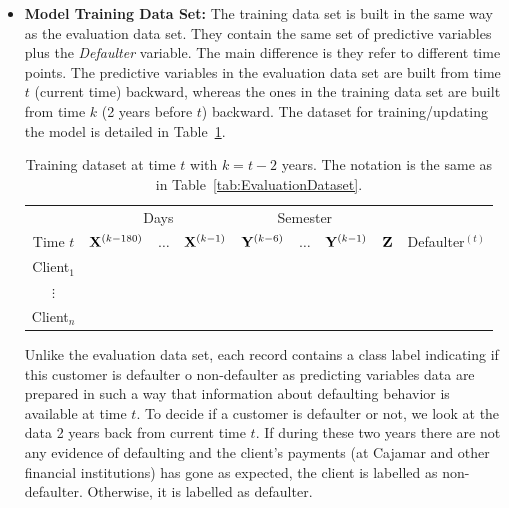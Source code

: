 \begin{itemize}
\item \textbf{Model Training Data Set:}  The training data set is built in the same way as the evaluation data set. They contain the same set of predictive variables plus the \emph{Defaulter} variable. The main difference is they refer to different time points. The predictive variables in the evaluation data set are built from time $t$ (current time) backward, whereas the ones in the training data set are built from time $k$ (2 years before $t$) backward. The dataset for training/updating the model is detailed in Table~\ref{tab:TrainingDataset}.
\begin{table}[h]
\centering
\begin{tabular}{c|ccc|ccc|c|c}
	&\multicolumn{3}{c|}{Days} & \multicolumn{3}{c|}{Semester} & \\
     Time $t$              & $\mathbf{X}^{(k-180)}$ & $\ldots$ & $\mathbf{X}^{(k-1)} $ & $\mathbf{Y}^{(k-6)}$  & $\ldots$ & $\mathbf{Y}^{(k-1)} $ & $\mathbf{Z}$ & Defaulter$^{(t)}$\\  
\hline
Client$_1$  &                                                  &              &                     &                               &                     &        &  \\ 
$\vdots$      &                                                 &               &                     &                                &                     &       & \\ 
Client$_n$  &                                                &               &                     &                                &                     &     & \\ 
\end{tabular} 
\caption{Training dataset at time $t$ with $k=t - 2$ years.  The notation is the same as in Table~\ref{tab:EvaluationDataset}.}
\label{tab:TrainingDataset} 
\end{table}

Unlike the evaluation data set, each record contains a class label indicating if this customer is defaulter o non-defaulter as predicting variables data are prepared in such a way that information about defaulting behavior is available at time $t$. To decide if a customer is defaulter or not, we look at the data 2 years back from current time $t$. If during these two years there are not any evidence of defaulting and the client's payments (at Cajamar and other financial institutions) has gone as expected, the client is labelled as non-defaulter. Otherwise, it is labelled as defaulter.

\end{itemize}

